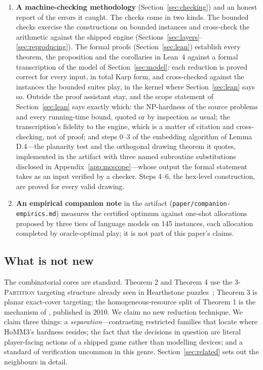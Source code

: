 \documentclass[11pt,a4paper]{article}
\theoremstyle{plain}
\theoremstyle{definition}
\theoremstyle{plain}
\theoremstyle{definition}
\theoremstyle{remark}
\newcommand{\THREEPART}{\textsc{3-Partition}}
\newcommand{\src}[1]{\texttt{#1}}
\begin{document}
\begin{enumerate}
  NP-hardness survives three further restrictions---an obstacle-free rectangle with
  \emph{complete reachability} (in the starting position, every stack can attack every enemy);
  a given allocation, which isolates unrestricted target assignment as the hard decision; and
  an objective changed from creatures killed to hit points removed.
\item \textbf{A machine-checking methodology} (Section~\ref{sec:checking}) and an honest
  report of the errors it caught. The checks come in two kinds. The bounded checks exercise
  the constructions on bounded instances and cross-check the arithmetic against the shipped
  engine (Sections~\ref{sec:layers}--\ref{sec:reproducing}). The formal proofs
  (Section~\ref{sec:lean}) establish every theorem, the proposition and the corollaries in
  Lean~4 against a formal transcription of the model of Section~\ref{sec:model}: each
  reduction is proved correct for every input, in total Karp form, and cross-checked against
  the instances the bounded suites play, in the kernel where Section~\ref{sec:lean} says so.
  Outside the proof assistant stay, and the scope statement of Section~\ref{sec:lean} says
  exactly which: the NP-hardness of the source problems and every running-time bound, quoted
  or by inspection as usual; the transcription's fidelity to the engine, which is a matter of
  citation and cross-checking, not of proof; and steps 0--3 of the embedding algorithm of
  Lemma D.4---the planarity test
  and the orthogonal drawing theorem it quotes, implemented in the artifact with three named
  subroutine substitutions disclosed in Appendix~\ref{app:mcscope}---whose output the formal
  statement takes as an input verified by a checker. Steps 4--6, the hex-level construction,
  are proved for every valid drawing.
\item \textbf{An empirical companion note} in the artifact
  (\src{paper/companion-empirics.md}) measures the certified optimum against one-shot
  allocations proposed by three tiers of language models on 145 instances, each allocation
  completed by oracle-optimal play; it is not part of this paper's claims.
\end{enumerate}

\subsection{What is not new}

The combinatorial cores are standard. Theorem 2 and Theorem 4 use the \THREEPART{} targeting
structure already seen in Hearthstone puzzles~\cite{HLW20}; Theorem 3 is planar exact-cover
targeting; the homogeneous-resource split of Theorem 1 is the mechanism of
\cite[Thm.~7]{FB10}, published in 2010. We claim no new reduction technique. We claim
three things: a \emph{separation}---contrasting restricted families that locate where HoMM3's
hardness resides; the fact that the decisions in question are literal player-facing actions of
a shipped game rather than modelling devices; and a standard of verification uncommon in this
genre. Section~\ref{sec:related} sets out the neighbours in detail.
\end{document}

